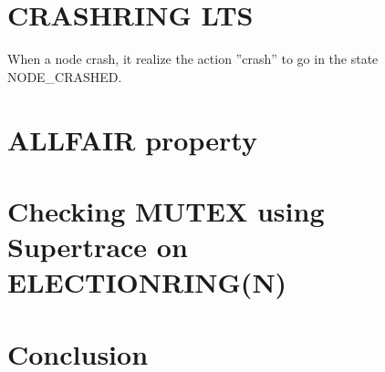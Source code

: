 \documentclass[fleqn]{article}
\begin{document}


\newpage
\section{CRASHRING LTS}



When a node crash, it realize the action ''crash'' to go in the state NODE\_CRASHED.

\section{ALLFAIR property}





\section{Checking MUTEX using Supertrace on ELECTIONRING(N)}


\section{Conclusion}

\end{document}
